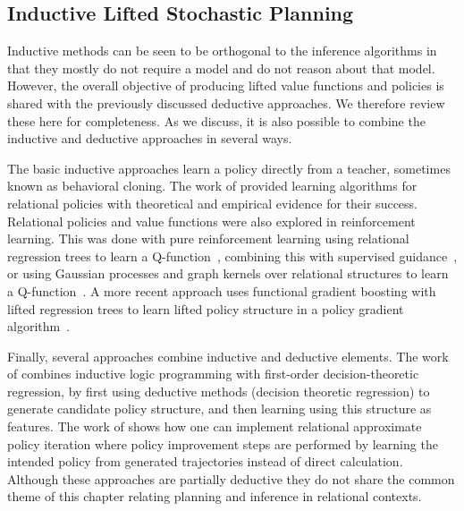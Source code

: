 %
%
%
%
%
%


%
%
%
%
%
%
%
%
%
%
%
%
%
%
%
%
%
%
%
%

%
%
%
%
%
%
%
%

\subsection{Inductive Lifted Stochastic Planning}

Inductive methods can be seen to be orthogonal to the inference algorithms in that they mostly do not require a model and do not reason about that model. However, 
%
%
%
%
%
%
%
the overall objective of
producing lifted value functions and policies is shared with the
previously discussed deductive approaches.  
We therefore review these here for completeness. As we discuss, it is also possible  
to combine the inductive and deductive approaches in several ways.


%
%
%
%
The basic inductive approaches learn a policy directly from a teacher, sometimes known as behavioral cloning. 
The work of \cite{Khardon96,Khardon99,givan:uai02} provided learning algorithms for relational policies with theoretical and empirical evidence for their success. 
Relational policies and value functions were also explored in reinforcement learning.
This
was done with pure reinforcement learning using relational 
%
regression trees to learn a 
%
Q-function~\citep{dzeroski01},
combining this with supervised guidance~\citep{driessens02}, or using
Gaussian processes and graph kernels over relational structures to
learn a 
%
Q-function~\citep{driessens06}.
A more recent approach uses 
functional gradient boosting with lifted
regression trees to learn lifted policy structure in
a policy gradient algorithm~\cite{kersting:nppg}.

Finally, several approaches combine inductive and deductive elements. 
The work of 
\cite{gretton_thiebaux} combines inductive logic programming with first-order
decision-theoretic regression, by first using deductive methods (decision theoretic regression) to
generate candidate policy structure, and then learning using this structure as features. 
The work of  \citep{givan:jair06} shows how one can implement relational approximate policy iteration where policy improvement steps are performed by learning the intended policy from generated trajectories instead of direct calculation. 
Although these approaches are partially deductive they do not share the common theme of this chapter relating planning and inference in relational contexts.  


%
%
%
%
%
%
%
%
%
%
%
%
%
%
%
%
%
%
%
%

%
%
%
%
%
%
%
%
%
%
%
%
%
%
%
%
%
%
%

